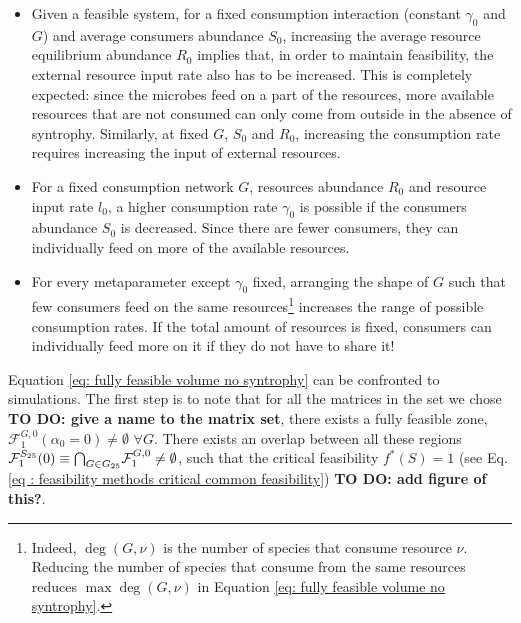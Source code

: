 \documentclass[12pt, titlepage]{report}
\begin{document}
\begin{itemize}
\item Given a feasible system, for a fixed consumption interaction (\ie constant $\gamma_0$ and $G$) and average consumers abundance $S_0$, increasing the average resource equilibrium abundance $R_0$ implies that, in order to maintain feasibility, the external resource input rate also has to be increased. This is completely expected: since the microbes feed on a part of the resources, more available resources that are not consumed can only come from outside in the absence of syntrophy. Similarly, at fixed $G$, $S_0$ and $R_0$, increasing the consumption rate requires increasing the input of external resources.

\item For a fixed consumption network $G$, resources abundance $R_0$ and resource input rate $l_0$, a higher consumption rate $\gamma_0$ is possible if the consumers abundance $S_0$ is decreased. Since there are fewer consumers, they can individually feed on more of the available resources.
\item For every metaparameter except $\gamma_0$ fixed, arranging the shape of $G$ such that few consumers feed on the same resources\footnote{Indeed, $\deg(G,\nu)$ is the number of species that consume resource $\nu$. Reducing the number of species that consume from the same resources reduces $\max{\deg(G,\nu)}$ in Equation \eqref{eq: fully feasible volume no syntrophy}.} increases the range of possible consumption rates. If the total amount of resources is fixed, consumers can individually feed more on it if they do not have to share it!
\end{itemize}
Equation \eqref{eq: fully feasible volume no syntrophy} can be confronted to simulations.
The first step is to note that for all the matrices in the set we chose \textbf{TO DO: give a name to the matrix set}, there exists a fully feasible zone, \ie $\mathcal{F}^{G, 0}_1(\alpha_0=0) \neq \emptyset$ $ \forall G$. There exists an overlap between all these regions $\mathcal{F}_1^{S_{25}}(0) \equiv {\bigcap}_{G \in G_{25}} \mathcal{F}^{G,0}_1 \neq \emptyset$, such that the critical feasibility $f^*(S)=1$ (see Eq.\eqref{eq : feasibility methods critical common feasibility}) \textbf{TO DO: add figure of this?}.
\end{document}
